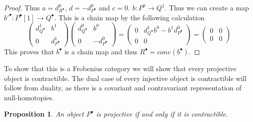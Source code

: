 \documentclass[11pt]{article}
\newtheorem{prop}[theorem]{Proposition}
\theoremstyle{definition}
\theoremstyle{remark}
\newcommand{\chain}[1]{#1^{\bullet}}
\begin{document}
\begin{proof}
                Thus $a = d^0_{\chain{R}}$, $d = -d^0_{\chain{P}}$ and $c=0$. $b:P^0\rightarrow Q^1$. Thus we can create a map $\chain{b'}:\chain{P}[1]\rightarrow\chain{Q}$. This is a chain map by the following calculation
                \begin{equation*}
                    \begin{pmatrix} d^1_{\chain{Q}} & b^1 \\ 0 & d^1_{\chain{P}} \end{pmatrix}\begin{pmatrix} d^0_{\chain{Q}} & b^0 \\ 0 & -d^0_{\chain{P}} \end{pmatrix} = \begin{pmatrix} 0 & d^1_{\chain{Q}}b^0 - b^1d^0_{\chain{P}} \\ 0 & 0 \end{pmatrix} = \begin{pmatrix} 0 & 0 \\ 0 & 0 \end{pmatrix}
                \end{equation*}
                This proves that $\chain{b}$ is a chain map and thus $\chain{R}=cone(\chain{b})$.
            \end{proof}

            To show that this is a Frobenius category we will show that every projective object is contractible. The dual case of every injective object is contractible will follow from duality, as there is a covariant and contravariant representation of null-homotopies.

            \begin{prop}
                An object $\chain{P}$ is projective if and only if it is contractible.
            \end{prop}
\end{document}
